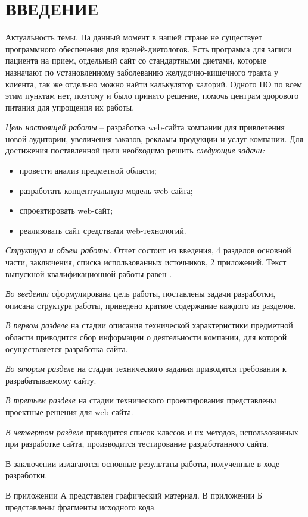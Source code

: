 \section*{ВВЕДЕНИЕ}
Актуальность темы. На данный момент в нашей стране не существует программного обеспечения для врачей-диетологов. Есть программа для записи пациента на прием, отдельный сайт со стандартными диетами, которые назначают по установленному заболеванию желудочно-кишечного тракта у клиента, так же отдельно можно найти калькулятор калорий. Одного ПО по всем этим пунктам нет, поэтому и было принято решение, помочь центрам здорового питания для упрощения их работы.

\emph{Цель настоящей работы} – разработка web-сайта компании для привлечения новой аудитории, увеличения заказов, рекламы продукции и услуг компании. Для достижения поставленной цели необходимо решить \emph{следующие задачи:}
\begin{itemize}
\item провести анализ предметной области;
\item разработать концептуальную модель web-сайта;
\item спроектировать web-сайт;
\item реализовать сайт средствами web-технологий.
\end{itemize}

\emph{Структура и объем работы.} Отчет состоит из введения, 4 разделов основной части, заключения, списка использованных источников, 2 приложений. Текст выпускной квалификационной работы равен .

\emph{Во введении} сформулирована цель работы, поставлены задачи разработки, описана структура работы, приведено краткое содержание каждого из разделов.

\emph{В первом разделе} на стадии описания технической характеристики предметной области приводится сбор информации о деятельности компании, для которой осуществляется разработка сайта.

\emph{Во втором разделе} на стадии технического задания приводятся требования к разрабатываемому сайту.

\emph{В третьем разделе} на стадии технического проектирования представлены проектные решения для web-сайта.

\emph{В четвертом разделе} приводится список классов и их методов, использованных при разработке сайта, производится тестирование разработанного сайта.

В заключении излагаются основные результаты работы, полученные в ходе разработки.

В приложении А представлен графический материал.
В приложении Б представлены фрагменты исходного кода. 
